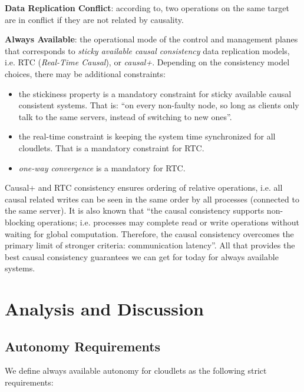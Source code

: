 \documentclass[conference]{IEEEtran}
\begin{document}
\textbf{Data Replication Conflict}: according to\cite{b1}, two operations on
the same target are in conflict if they are not related by causality.

\textbf{Always Available}: the operational mode of the control and management
planes that corresponds to \textit{sticky available causal
consistency}\cite{b4} data replication models, i.e. RTC (\textit{Real-Time
Causal}\cite{b2}), or \textit{causal+}\cite{b1}. Depending on the consistency
model choices, there may be additional constraints:

\begin{itemize}
  \item the stickiness property is a mandatory constraint for sticky available
    causal consistent systems. That is: ``on every non-faulty node, so long
    as clients only talk to the same servers, instead of switching to new
    ones''\cite{b4}.

  \item the real-time constraint is keeping the system time synchronized for
    all cloudlets. That is a mandatory constraint for RTC.

  \item \textit{one-way convergence}\cite{b2} is a mandatory for RTC.
\end{itemize}

Causal+ and RTC consistency ensures ordering of relative operations, i.e. all
causal related writes can be seen in the same order by all processes
(connected to the same server). It is also known that ``the causal consistency
supports non-blocking operations; i.e. processes may complete read or write
operations without waiting for global computation. Therefore, the causal
consistency overcomes the primary limit of stronger criteria: communication
latency''\cite{b6}. All that provides the best causal consistency guarantees we
can get for today for always available systems.

\section{Analysis and Discussion}

\subsection{Autonomy Requirements}

We define always available autonomy for cloudlets as the following strict
requirements:
\end{document}
